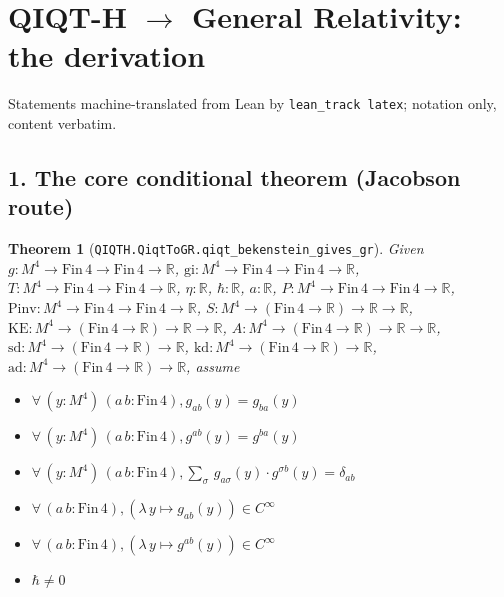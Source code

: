\documentclass[11pt]{article}
\newtheorem{theorem}{Theorem}[section]
\begin{document}
\section*{QIQT-H \(\to\) General Relativity: the derivation}
\noindent\small Statements machine-translated from Lean by \texttt{lean\_track latex}; notation only, content verbatim.\normalsize\par\medskip
\subsection*{1. The core conditional theorem (Jacobson route)}
\begin{theorem}[\texttt{QIQTH.QiqtToGR.qiqt\_bekenstein\_gives\_gr}]\label{thm:qiqth-qiqttogr-qiqt-bekenstein-gives-gr}
Given $g : M^{{4}} \to \mathrm{Fin}\,4 \to \mathrm{Fin}\,4 \to \mathbb{R}$, $\mathrm{gi} : M^{{4}} \to \mathrm{Fin}\,4 \to \mathrm{Fin}\,4 \to \mathbb{R}$, $T : M^{{4}} \to \mathrm{Fin}\,4 \to \mathrm{Fin}\,4 \to \mathbb{R}$, $\eta : \mathbb{R}$, $\hbar : \mathbb{R}$, $a : \mathbb{R}$, $P : M^{{4}} \to \mathrm{Fin}\,4 \to \mathrm{Fin}\,4 \to \mathbb{R}$, $\mathrm{Pinv} : M^{{4}} \to \mathrm{Fin}\,4 \to \mathrm{Fin}\,4 \to \mathbb{R}$, $S : M^{{4}} \to (\mathrm{Fin}\,4 \to \mathbb{R}) \to \mathbb{R} \to \mathbb{R}$, $\mathrm{KE} : M^{{4}} \to (\mathrm{Fin}\,4 \to \mathbb{R}) \to \mathbb{R} \to \mathbb{R}$, $A : M^{{4}} \to (\mathrm{Fin}\,4 \to \mathbb{R}) \to \mathbb{R} \to \mathbb{R}$, $\mathrm{sd} : M^{{4}} \to (\mathrm{Fin}\,4 \to \mathbb{R}) \to \mathbb{R}$, $\mathrm{kd} : M^{{4}} \to (\mathrm{Fin}\,4 \to \mathbb{R}) \to \mathbb{R}$, $\mathrm{ad} : M^{{4}} \to (\mathrm{Fin}\,4 \to \mathbb{R}) \to \mathbb{R}$,
assume
\begin{itemize}
  \item[\rm(hsymm)] $\forall\,(y : M^{{4}})\,(a\,b : \mathrm{Fin}\,4), g_{{a}{b}}({y}) = g_{{b}{a}}({y})$
  \item[\rm(hsymm\_gi)] $\forall\,(y : M^{{4}})\,(a\,b : \mathrm{Fin}\,4), g^{{a}{b}}({y}) = g^{{b}{a}}({y})$
  \item[\rm(hinv)] $\forall\,(y : M^{{4}})\,(a\,b : \mathrm{Fin}\,4), \sum_{\sigma}\,g_{{a}{\sigma}}({y}) \cdot g^{{\sigma}{b}}({y}) = \delta_{ab}$
  \item[\rm(hCg)] $\forall\,(a\,b : \mathrm{Fin}\,4), ({\lambda\,y \mapsto g_{{a}{b}}({y})})\in C^{\infty}$
  \item[\rm(hCgi)] $\forall\,(a\,b : \mathrm{Fin}\,4), ({\lambda\,y \mapsto g^{{a}{b}}({y})})\in C^{\infty}$
  \item[\rm(hbar0)] $\hbar \ne 0$

\end{itemize}
\end{theorem}
\end{document}
